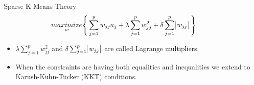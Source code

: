 \documentclass{beamer}
\newlength{\tmpShadow}
\newcommand{\MyShadow}[2]{%
	\settowidth{\tmpShadow}{#1}
	\addtolength{\tmpShadow}{.1em}
	\raisebox{-0.25ex}{\textcolor{gray!70}{#1}}%
	\kern-\tmpShadow%
	\textcolor{#2}{#1}%
}
\begin{document}
{\begin{frame}{Sparse K-Means Theory}
	\begin{align}\nonumber
		\underset{w}{maximize}& \Bigg\{ \sum_{j=1}^{p} w_{jj}a_j + \lambda\sum_{j=1}^{p} w_{jj}^{2} + \delta\sum_{j=1}^{p} \abs{w_{jj}} \Bigg\}
	\end{align}	
	\vspace{5mm}
	\begin{itemize}[label={\MyShadow{$\bullet$}{blue!80}}]
		\item<1-> $\lambda\sum_{j=1}^{p} w_{jj}^{2}$ and $\delta\sum_{j=1}^{p} \abs{w_{jj}}$ are called Lagrange multipliers.
		\vspace{5mm}
		\item<1-> When the constraints are having both equalities and inequalities we extend to Karush-Kuhn-Tucker (KKT) conditions.
	\end{itemize}	
\end{frame}

}
\end{document}
